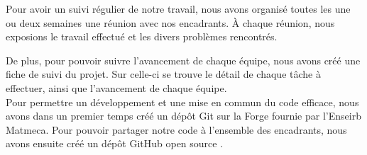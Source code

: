 \noindent Pour avoir un suivi régulier de notre travail, nous avons organisé toutes les une ou deux semaines une réunion avec nos encadrants.
À chaque réunion, nous exposions le travail effectué et les divers problèmes rencontrés.

\noindent De plus, pour pouvoir suivre l'avancement de chaque équipe, nous avons créé une fiche de suivi du projet.
Sur celle-ci se trouve le détail de chaque tâche à effectuer, ainsi que l'avancement de chaque équipe.\\

\noindent Pour permettre un développement et une mise en commun du code efficace, nous avons dans un premier temps créé un dépôt Git sur la Forge fournie par l'Enseirb Matmeca.
Pour pouvoir partager notre code à l'ensemble des encadrants, nous avons ensuite créé un dépôt GitHub open source \cite{GitHub}.
